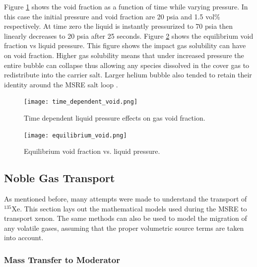 Figure \ref{fig:time_dependent_void} shows the void fraction as a function of time while varying pressure. In this case the initial pressure and void fraction are 20 psia and 1.5 vol\% respectively. At time zero the liquid is instantly pressurized to 70 psia then linearly decreases to 20 psia after 25 seconds. Figure \ref{fig:equ_void} shows the equilibrium void fraction vs liquid pressure. This figure shows the impact gas solubility can have on void fraction. Higher gas solubility means that under increased pressure the entire bubble can collapse thus allowing any species dissolved in the cover gas to redistribute into the carrier salt. Larger helium bubble also tended to retain their identity around the MSRE salt loop \cite{steffy1969}.

\vspace{12.7mm} %

\begin{figure}[ht]
  \centering
  \texttt{[image: time\_dependent\_void.png]}\\
  \caption{Time dependent liquid pressure effects on gas void fraction. \cite{steffy1969}}
  \label{fig:time_dependent_void}
\end{figure} 


\newpage

\begin{figure}[ht]
  \centering
  \texttt{[image: equilibrium\_void.png]}\\
  \caption{Equilibrium void fraction vs. liquid pressure. \cite{steffy1969}}
  \label{fig:equ_void}
\end{figure} 



\subsection{Noble Gas Transport}
As mentioned before, many attempts were made to understand the transport of ${}^{135}$Xe. This section lays out the mathematical models used during the MSRE to transport xenon. The same methods can also be used to model the migration of any volatile gases, assuming that the proper volumetric source terms are taken into account. 

\subsubsection{Mass Transfer to Moderator}

